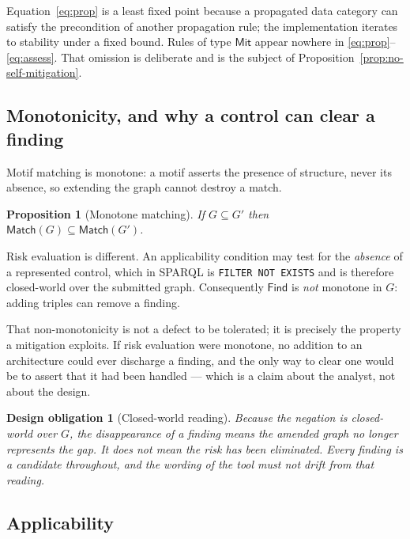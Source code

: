 \documentclass[11pt,a4paper]{article}
\theoremstyle{definition}
\theoremstyle{plain}
\newtheorem{proposition}{Proposition}
\newtheorem{obligation}{Design obligation}
\newcommand{\Arch}{G}
\newcommand{\Match}{\mathsf{Match}}
\newcommand{\Find}{\mathsf{Find}}
\begin{document}
Equation~\eqref{eq:prop} is a least fixed point because a propagated data
category can satisfy the precondition of another propagation rule; the
implementation iterates to stability under a fixed bound. Rules of type
$\mathsf{Mit}$ appear nowhere in \eqref{eq:prop}--\eqref{eq:assess}. That
omission is deliberate and is the subject of
Proposition~\ref{prop:no-self-mitigation}.

\subsection{Monotonicity, and why a control can clear a finding}

Motif matching is monotone: a motif asserts the presence of structure, never its
absence, so extending the graph cannot destroy a match.

\begin{proposition}[Monotone matching]
\label{prop:monotone-match}
If $\Arch \subseteq \Arch'$ then $\Match(\Arch) \subseteq \Match(\Arch')$.
\end{proposition}

\noindent Risk evaluation is different. An applicability condition may test for
the \emph{absence} of a represented control, which in SPARQL is
\texttt{FILTER NOT EXISTS} and is therefore closed-world over the submitted
graph. Consequently $\Find$ is \emph{not} monotone in $\Arch$: adding triples
can remove a finding.

That non-monotonicity is not a defect to be tolerated; it is precisely the
property a mitigation exploits. If risk evaluation were monotone, no addition to
an architecture could ever discharge a finding, and the only way to clear one
would be to assert that it had been handled --- which is a claim about the
analyst, not about the design.

\begin{obligation}[Closed-world reading]
\label{obl:cwa}
Because the negation is closed-world over $\Arch$, the disappearance of a
finding means \emph{the amended graph no longer represents the gap}. It does not
mean the risk has been eliminated. Every finding is a candidate throughout, and
the wording of the tool must not drift from that reading.
\end{obligation}

\subsection{Applicability}
\end{document}

